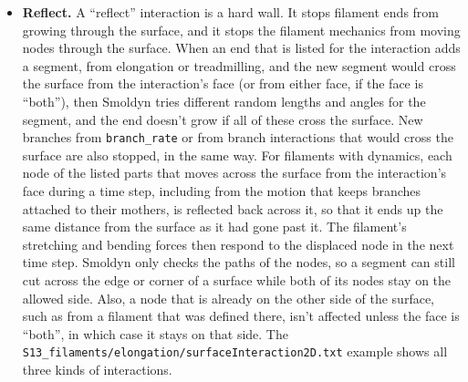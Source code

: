 \documentclass {scrbook}
\newcommand {\ttt} {\texttt}
\begin{document}
\begin{itemize}
\item \textbf{Reflect.} A ``reflect'' interaction is a hard wall. It stops filament ends from growing through the surface, and it stops the filament mechanics from moving nodes through the surface. When an end that is listed for the interaction adds a segment, from elongation or treadmilling, and the new segment would cross the surface from the interaction's face (or from either face, if the face is ``both''), then Smoldyn tries different random lengths and angles for the segment, and the end doesn't grow if all of these cross the surface. New branches from \ttt{branch\_rate} or from branch interactions that would cross the surface are also stopped, in the same way. For filaments with dynamics, each node of the listed parts that moves across the surface from the interaction's face during a time step, including from the motion that keeps branches attached to their mothers, is reflected back across it, so that it ends up the same distance from the surface as it had gone past it. The filament's stretching and bending forces then respond to the displaced node in the next time step. Smoldyn only checks the paths of the nodes, so a segment can still cut across the edge or corner of a surface while both of its nodes stay on the allowed side. Also, a node that is already on the other side of the surface, such as from a filament that was defined there, isn't affected unless the face is ``both'', in which case it stays on that side. The \ttt{S13\_filaments/elongation/surfaceInteraction2D.txt} example shows all three kinds of interactions.


\end{itemize}
\end{document}
